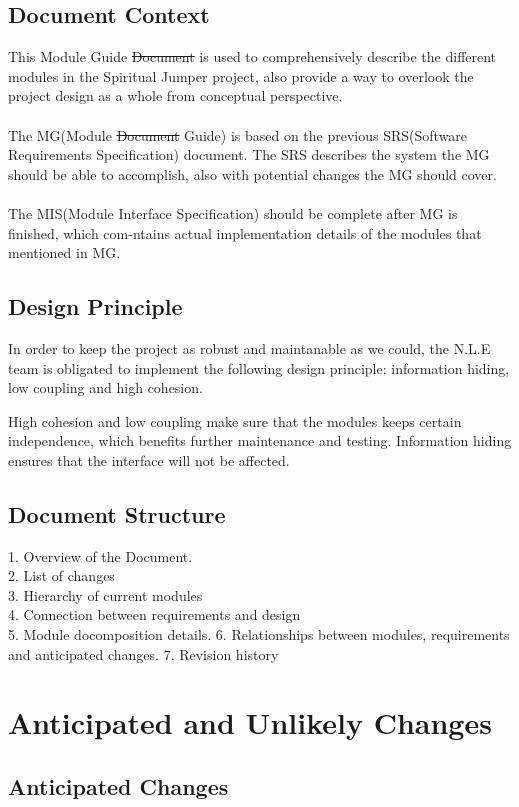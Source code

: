 \documentclass[12pt, titlepage]{article}
\newcommand{\rev}[1]{\textcolor{RevisionColour}{#1}}
\begin{document}
\subsection{Document Context}
This Module Guide \sout{Document} is used to comprehensively describe the different modules in the Spiritual Jumper project, also provide a way to overlook the project design as a whole from conceptual perspective.\\\\
The MG(Module \sout{Document} \rev{Guide}) is based on the previous SRS(Software Requirements Specification) document. The SRS describes the system the MG should be able to accomplish, also with potential changes the MG should cover.\\\\
The MIS(Module Interface Specification) should be complete after MG is finished, which com-ntains actual implementation details of the modules that mentioned in MG.
\subsection{Design Principle}
In order to keep the project as robust and maintanable as we could, the N.L.E team is obligated to implement the following design principle: information hiding, low coupling and high cohesion.

High cohesion and low coupling make sure that the modules keeps certain independence, which benefits further maintenance and testing. Information hiding ensures that the interface will not be affected.
\subsection{Document Structure}
1. Overview of the Document.\\
2. List of changes\\
3. Hierarchy of current modules\\
4. Connection between requirements and design\\
5. Module docomposition details.
6. Relationships between modules, requirements and anticipated changes.
7. Revision history

\section{Anticipated and Unlikely Changes} \label{SecChange}

\subsection{Anticipated Changes} \label{SecAchange}
\end{document}
